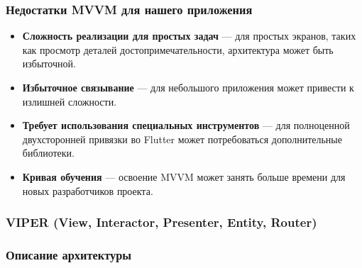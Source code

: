 \subsubsection*{Недостатки MVVM для нашего приложения}
\begin{itemize}
    \item \textbf{Сложность реализации для простых задач} — для простых экранов, таких как просмотр деталей достопримечательности, архитектура может быть избыточной.
    \item \textbf{Избыточное связывание} — для небольшого приложения может привести к излишней сложности.
    \item \textbf{Требует использования специальных инструментов} — для полноценной двухсторонней привязки во Flutter может потребоваться дополнительные библиотеки.
    \item \textbf{Кривая обучения} — освоение MVVM может занять больше времени для новых разработчиков проекта.
\end{itemize}

\subsubsection*{VIPER (View, Interactor, Presenter, Entity, Router)}

\subsubsection*{Описание архитектуры}

